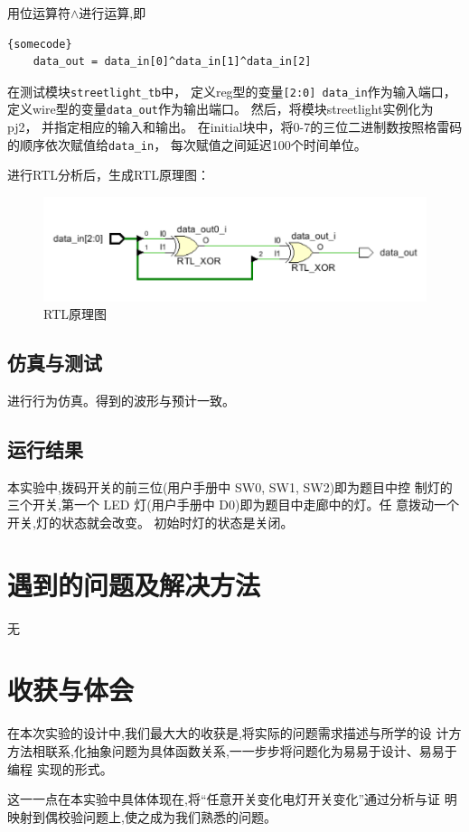 \documentclass[UTF8]{article}
\begin{document}
用位运算符$\wedge$进行运算,即
\lstset{language=verilog}
\begin{lstlisting}[frame=tb]{somecode}
    data_out = data_in[0]^data_in[1]^data_in[2]
\end{lstlisting}

在测试模块\lstinline{streetlight_tb}中，
定义reg型的变量\lstinline{[2:0] data_in}作为输入端口，
定义wire型的变量\lstinline{data_out}作为输出端口。
然后，将模块streetlight实例化为pj2，
并指定相应的输入和输出。
在initial块中，将0-7的三位二进制数按照格雷码的顺序依次赋值给\lstinline{data_in}，
每次赋值之间延迟100个时间单位。

进行RTL分析后，生成RTL原理图：
​
\begin{figure}[htbp]
    \centering
    \includegraphics[scale=0.7]{0.png}
    \caption{RTL原理图}
\end{figure}

\subsection{仿真与测试}
进行行为仿真。得到的波形与预计一致。
\subsection{运行结果}

本实验中,拨码开关的前三位(用户手册中 SW0, SW1, SW2)即为题目中控
制灯的三个开关,第一个 LED 灯(用户手册中 D0)即为题目中走廊中的灯。任
意拨动一个开关,灯的状态就会改变。
初始时灯的状态是关闭。

\section{遇到的问题及解决方法}
无
\section{收获与体会}

在本次实验的设计中,我们最大大的收获是,将实际的问题需求描述与所学的设
计方方法相联系,化抽象问题为具体函数关系,一一步步将问题化为易易于设计、易易于编程
实现的形式。

这一一点在本实验中具体体现在,将“任意开关变化电灯开关变化”通过分析与证
明映射到偶校验问题上,使之成为我们熟悉的问题。
\end{document}
